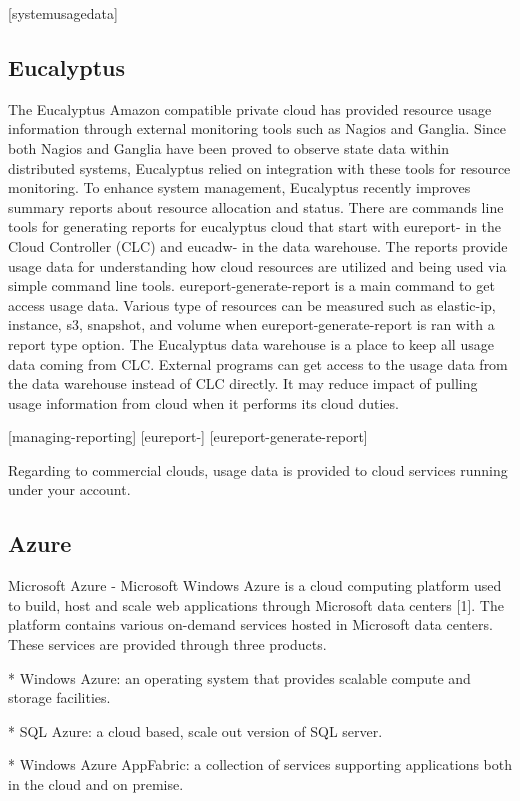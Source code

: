 \documentclass{sig-alternate}
\begin{document}
[systemusagedata]

\subsection{Eucalyptus}

The Eucalyptus Amazon compatible private cloud has provided resource usage information through external monitoring tools such as Nagios and Ganglia. Since both Nagios and Ganglia have been proved to observe state data within distributed systems, Eucalyptus relied on integration with these tools for resource monitoring. To enhance system management, Eucalyptus recently improves summary reports about resource allocation and status. There are commands line tools for generating reports for eucalyptus cloud that start with eureport- in the Cloud Controller (CLC) and eucadw- in the data warehouse. The reports provide usage data for understanding how cloud resources are utilized and being used via simple command line tools. eureport-generate-report is a main command to get access usage data. Various type of resources can be measured such as elastic-ip, instance, s3, snapshot, and volume when eureport-generate-report is ran with a report type option. The Eucalyptus data warehouse is a place to keep all usage data coming from CLC. External programs can get access to the usage data from the data warehouse instead of CLC directly. It may reduce impact of pulling usage information from cloud when it performs its cloud duties.

[managing-reporting] [eureport-] [eureport-generate-report]

Regarding to commercial clouds, usage data is provided to cloud services running under your account.

\subsection{Azure}

Microsoft Azure - Microsoft Windows Azure is a cloud computing platform used to build, host and scale web applications through Microsoft data centers [1]. The platform contains various on-demand services hosted in Microsoft data centers. These services are provided through three products.

* Windows Azure: an operating system that provides scalable compute and storage facilities.

* SQL Azure: a cloud based, scale out version of SQL server.

* Windows Azure AppFabric: a collection of services supporting applications both in the cloud and on premise.
\end{document}
